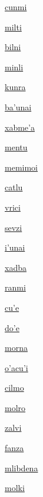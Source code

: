 {\hyperlink{val:cunmi}{cunmi}}{}{}{}

{\hyperlink{val:milti}{milti}}{}{}{}

{\hyperlink{val:bilni}{bilni}}{}{}{}

{\hyperlink{val:minli}{minli}}{}{}{}

{\hyperlink{val:kunra}{kunra}}{}{}{}

{\hyperlink{val:bahunai}{ba'unai}}{}{}{}

{\hyperlink{val:xabmeha}{xabme'a}}{}{}{}

{\hyperlink{val:mentu}{mentu}}{}{}{}

{\hyperlink{val:memimoi}{memimoi}}{}{}{}

{\hyperlink{val:catlu}{catlu}}{}{}{}

{\hyperlink{val:vrici}{vrici}}{}{}{}

{\hyperlink{val:sevzi}{sevzi}}{}{}{}

{\hyperlink{val:ihunai}{i'unai}}{}{}{}

{\hyperlink{val:xadba}{xadba}}{}{}{}

{\hyperlink{val:ranmi}{ranmi}}{}{}{}

{\hyperlink{val:cuhe}{cu'e}}{}{}{}

{\hyperlink{val:dohe}{do'e}}{}{}{}

{\hyperlink{val:morna}{morna}}{}{}{}

{\hyperlink{val:ohacuhi}{o'acu'i}}{}{}{}

{\hyperlink{val:cilmo}{cilmo}}{}{}{}

{\hyperlink{val:molro}{molro}}{}{}{}

{\hyperlink{val:zalvi}{zalvi}}{}{}{}

{\hyperlink{val:fanza}{fanza}}{}{}{}

{\hyperlink{val:mlibdena}{mlibdena}}{}{}{}

{\hyperlink{val:molki}{molki}}{}{}{}

